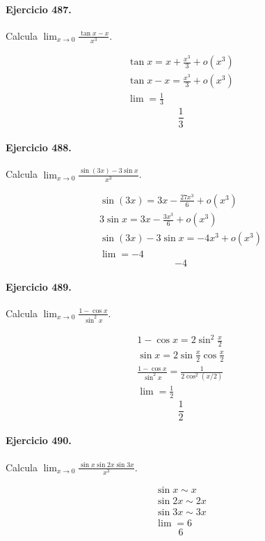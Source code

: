\documentclass[11pt,a4paper]{article}
\begin{document}
\paragraph{Ejercicio 487.} Calcula $\displaystyle \lim_{x\to0}\frac{\tan x-x}{x^3}$.

\[
\begin{aligned}
\tan x=x+\frac{x^3}{3}+o(x^3)\\
\tan x-x=\frac{x^3}{3}+o(x^3)\\
\lim=\frac13
\end{aligned}
\]
\[\boxed{\frac13}\]


\paragraph{Ejercicio 488.} Calcula $\displaystyle \lim_{x\to0}\frac{\sin(3x)-3\sin x}{x^3}$.

\[
\begin{aligned}
\sin(3x)=3x-\frac{27x^3}{6}+o(x^3)\\
3\sin x=3x-\frac{3x^3}{6}+o(x^3)\\
\sin(3x)-3\sin x=-4x^3+o(x^3)\\
\lim=-4
\end{aligned}
\]
\[\boxed{-4}\]


\paragraph{Ejercicio 489.} Calcula $\displaystyle \lim_{x\to0}\frac{1-\cos x}{\sin^2x}$.

\[
\begin{aligned}
1-\cos x=2\sin^2\frac{x}{2}\\
\sin x=2\sin\frac{x}{2}\cos\frac{x}{2}\\
\frac{1-\cos x}{\sin^2x}=\frac{1}{2\cos^2(x/2)}\\
\lim=\frac12
\end{aligned}
\]
\[\boxed{\frac12}\]


\paragraph{Ejercicio 490.} Calcula $\displaystyle \lim_{x\to0}\frac{\sin x\sin2x\sin3x}{x^3}$.

\[
\begin{aligned}
\sin x\sim x\\
\sin2x\sim2x\\
\sin3x\sim3x\\
\lim=6
\end{aligned}
\]
\[\boxed{6}\]
\end{document}
